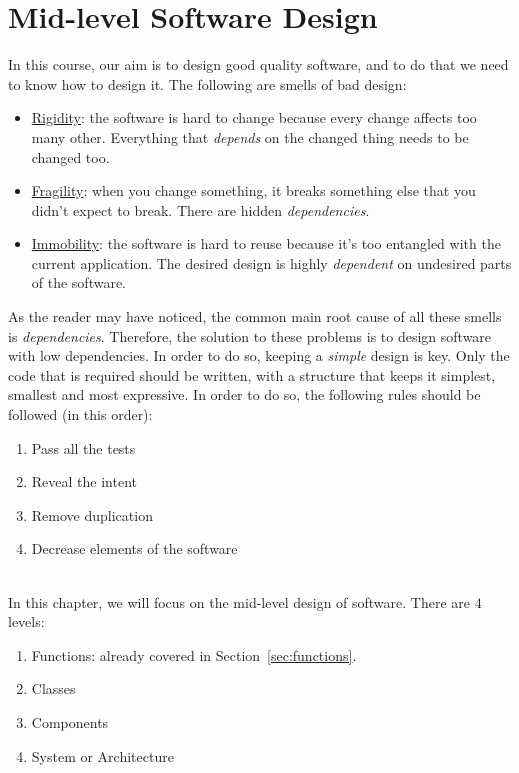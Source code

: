 
\chapter{Mid-level Software Design}

In this course, our aim is to design good quality software, and to do that we need to know how to design it. The following are smells of bad design:
\begin{itemize}
    \item \ul{Rigidity}: the software is hard to change because every change affects too many other. Everything that \emph{depends} on the changed thing needs to be changed too.
    \item \ul{Fragility}: when you change something, it breaks something else that you didn't expect to break. There are hidden \emph{dependencies}.
    \item \ul{Immobility}: the software is hard to reuse because it's too entangled with the current application. The desired design is highly \emph{dependent} on undesired parts of the software.
\end{itemize}

As the reader may have noticed, the common main root cause of all these smells is \emph{dependencies}. Therefore, the solution to these problems is to design software with low dependencies. In order to do so, keeping a \emph{simple} design is key. Only the code that is required should be written, with a structure that keeps it simplest, smallest and most expressive. In order to do so, the following rules should be followed (in this order):
\begin{enumerate}
    \item Pass all the tests
    \item Reveal the intent
    \item Remove duplication
    \item Decrease elements of the software
\end{enumerate}~\\

In this chapter, we will focus on the mid-level design of software. There are $4$ levels:
\begin{enumerate}
    \item Functions: already covered in Section~\ref{sec:functions}.
    \item Classes
    \item Components
    \item System or Architecture
\end{enumerate}


